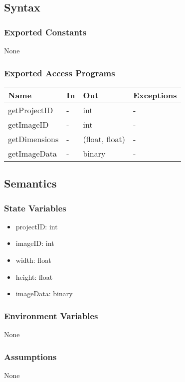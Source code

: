 \documentclass[12pt, titlepage]{article}
\begin{document}
\subsection{Syntax}

\subsubsection{Exported Constants}
None
\subsubsection{Exported Access Programs}

\begin{center}
\begin{tabular}{p{3.2cm} p{4cm} p{4cm} p{2cm}}
\hline
\textbf{Name} & \textbf{In} & \textbf{Out} & \textbf{Exceptions} \\
\hline
getProjectID & - & int & - \\
getImageID & - & int & - \\
getDimensions & - & (float, float) & - \\
getImageData & - & binary & - \\
\hline
\end{tabular}
\end{center}

\subsection{Semantics}

\subsubsection{State Variables}
\begin{itemize}
    \item projectID: int
    \item imageID: int
    \item width: float
    \item height: float
    \item imageData: binary
\end{itemize}
\subsubsection{Environment Variables}
None

\subsubsection{Assumptions}
None
\end{document}
